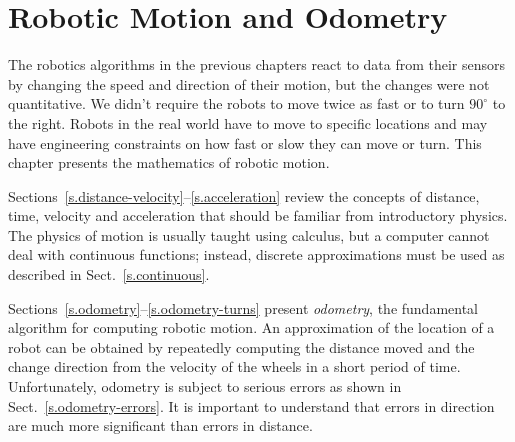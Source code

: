 
\chapter{Robotic Motion and Odometry}\label{ch.motion}


The robotics algorithms in the previous chapters react to data from their sensors by changing the speed and direction of their motion, but the changes were not quantitative. We didn't require the robots to move twice as fast or to turn $90^\circ$ to the right. Robots in the real world have to move to specific locations and may have engineering constraints on how fast or slow they can move or turn. This chapter presents the mathematics of robotic motion.

Sections~\ref{s.distance-velocity}--\ref{s.acceleration} review the concepts of distance, time, velocity and acceleration that should be familiar from introductory physics. The physics of motion is usually taught using calculus, but a computer cannot deal with continuous functions; instead, discrete approximations must be used as described in Sect.~\ref{s.continuous}.

Sections~\ref{s.odometry}--\ref{s.odometry-turns} present \emph{odometry}, the fundamental algorithm for computing robotic motion. An approximation of the location of a robot can be obtained by repeatedly computing the distance moved and the change direction from the velocity of the wheels in a short period of time. Unfortunately, odometry is subject to serious errors as shown in Sect.~\ref{s.odometry-errors}. It is important to understand that errors in direction are much more significant than errors in distance.

